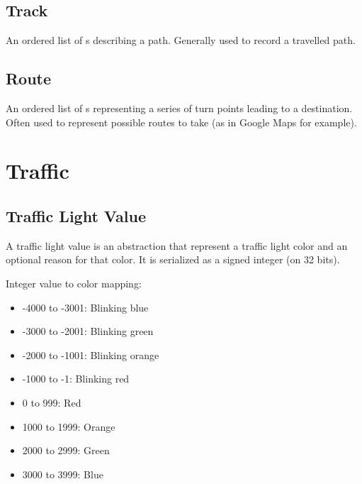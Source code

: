 \documentclass[letterpaper,10pt,english]{sphinxmanual}
\begin{document}
\subsection{Track}
\label{\detokenize{taxonomy_serialization:track}}\label{\detokenize{taxonomy_serialization:id9}}
An ordered list of {\hyperref[\detokenize{taxonomy_serialization:waypoint}]{}}s describing a path.
Generally used to record a travelled path.


\subsection{Route}
\label{\detokenize{taxonomy_serialization:route}}\label{\detokenize{taxonomy_serialization:id10}}
An ordered list of {\hyperref[\detokenize{taxonomy_serialization:waypoint}]{}}s representing a series of turn points leading to a destination.
Often used to represent possible routes to take (as in Google Maps for example).


\section{Traffic}
\label{\detokenize{taxonomy_serialization:traffic}}

\subsection{Traffic Light Value}
\label{\detokenize{taxonomy_serialization:traffic-light-value}}\label{\detokenize{taxonomy_serialization:id11}}
A traffic light value is an abstraction that represent a traffic light color and an optional reason for that color.
It is serialized as a signed integer (on 32 bits).

Integer value to color mapping:
\begin{itemize}
\item {} 
-4000 to -3001: Blinking blue

\item {} 
-3000 to -2001: Blinking green

\item {} 
-2000 to -1001: Blinking orange

\item {} 
-1000 to -1: Blinking red

\item {} 
0 to 999: Red

\item {} 
1000 to 1999: Orange

\item {} 
2000 to 2999: Green

\item {} 
3000 to 3999: Blue

\end{itemize}
\end{document}

